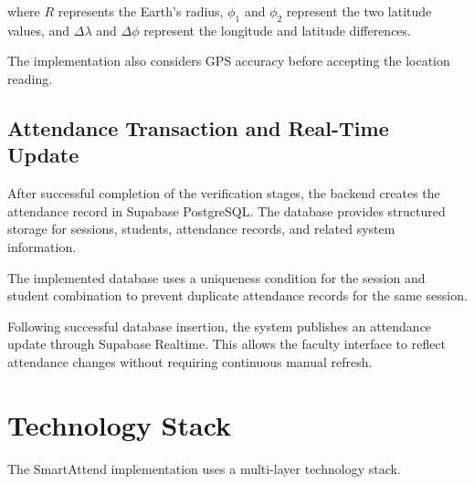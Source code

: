 \documentclass[conference]{IEEEtran}
\begin{document}
where $R$ represents the Earth's radius, $\phi_1$ and $\phi_2$ represent the two latitude values, and $\Delta\lambda$ and $\Delta\phi$ represent the longitude and latitude differences.

The implementation also considers GPS accuracy before accepting the location reading.


\subsection{Attendance Transaction and Real-Time Update}

After successful completion of the verification stages, the backend creates the attendance record in Supabase PostgreSQL. The database provides structured storage for sessions, students, attendance records, and related system information.

The implemented database uses a uniqueness condition for the session and student combination to prevent duplicate attendance records for the same session.

Following successful database insertion, the system publishes an attendance update through Supabase Realtime. This allows the faculty interface to reflect attendance changes without requiring continuous manual refresh.


\section{Technology Stack}

The SmartAttend implementation uses a multi-layer technology stack.
\end{document}
